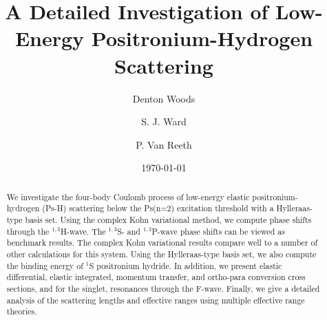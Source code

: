 \documentclass[preprint,showpacs,preprintnumbers,amsmath,amssymb,longbibliography,pra,aps]{revtex4-1}
\begin{document}

\title{A Detailed Investigation of Low-Energy Positronium-Hydrogen Scattering}

\author{Denton Woods}
\author{S. J. Ward}

\author{P. Van Reeth}

\date{\today}%


\begin{abstract}
We investigate the four-body Coulomb process of low-energy elastic positronium-hydrogen (Ps-H) scattering below the Ps(n=2) excitation threshold with a Hylleraas-type basis set. Using the complex Kohn variational method, we compute phase shifts through the $^{1,3}$H-wave. The $^{1,3}$S- and $^{1,3}$P-wave phase shifts can be viewed as benchmark results. The complex Kohn variational results compare well to a number of other calculations for this system. Using the Hylleraas-type basis set, we also compute the binding energy of $^1$S positronium hydride. In addition, we present elastic differential, elastic integrated, momentum transfer, and ortho-para conversion cross sections, and for the singlet, resonances through the F-wave. Finally, we give a detailed analysis of the scattering lengths and effective ranges using multiple effective range theories.
\end{abstract}
\end{document}
